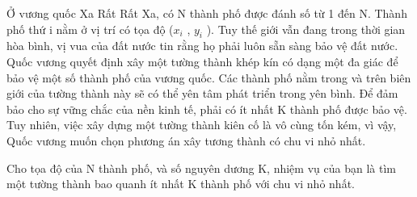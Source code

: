 Ở vương quốc Xa Rất Rất Xa, có N thành phố được đánh số từ 1 đến N. Thành phố thứ i nằm ở vị trí có tọa độ ($x_{i}$ , $y_{i}$ ). Tuy thế giới vẫn đang trong thời gian hòa bình, vị vua của đất nước tin rằng họ phải luôn sẵn sàng bảo vệ đất nước. Quốc vương quyết định xây một tường thành khép kín có dạng một đa giác để bảo vệ một số thành phố của vương quốc. Các thành phố nằm trong và trên biên giới của tường thành này sẽ có thể yên tâm phát triển trong yên bình. Để đảm bảo cho sự vững chắc của nền kinh tế, phải có ít nhất K thành phố được bảo vệ. Tuy nhiên, việc xây dựng một tường thành kiên cố là vô cùng tốn kém, vì vậy, Quốc vương muốn chọn phương án xây tương thành có chu vi nhỏ nhất.

Cho tọa độ của N thành phố, và số nguyên dương K, nhiệm vụ của bạn là tìm một tường thành bao quanh ít nhất K thành phố với chu vi nhỏ nhất.